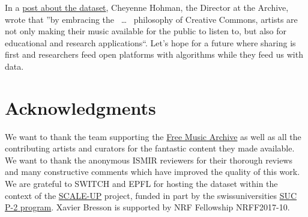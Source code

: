 \documentclass{article}
\begin{document}
In a \href{https://freemusicarchive.org/member/cheyenne_h/blog/FMA_Dataset_for_Researchers}{post about the dataset}, Cheyenne Hohman, the Director at the Archive, wrote that ''by embracing the
~\ldots~%
philosophy of Creative Commons, artists are not only making their music available for the public to listen to, but also for educational and research applications``.
Let's hope for a future where sharing is first and researchers feed open platforms with algorithms while they feed us with data.


\section{Acknowledgments}


We want to thank the team supporting the \href{https://freemusicarchive.org}{Free Music Archive} as well as all the contributing artists and curators for the fantastic content they made available.
We want to thank the anonymous ISMIR reviewers for their thorough reviews and many constructive comments which have improved the quality of this work.
We are grateful to SWITCH and EPFL for hosting the dataset within the context of the \href{https://projects.switch.ch/scale-up}{SCALE-UP} project, funded in part by the swissuniversities \href{http://www.swissuniversities.ch/isci}{SUC P-2 program}.
Xavier Bresson is supported by NRF Fellowship NRFF2017-10.


\end{document}
